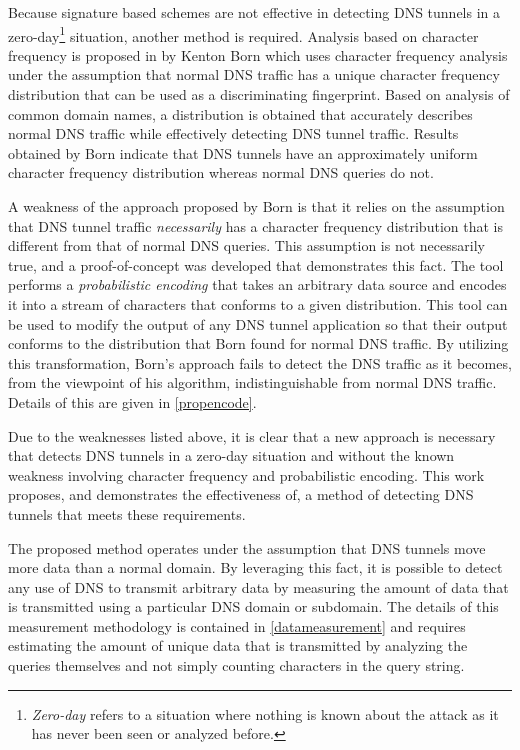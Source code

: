 \documentclass{article}
\theoremstyle{remark}
\theoremstyle{definition}
\theoremstyle{definition}
\theoremstyle{definition}
\begin{document}
Because signature based schemes are not effective in detecting DNS tunnels in a
zero-day\footnote{\emph{Zero-day} refers to a situation where nothing is
known about the attack as it has never been seen or analyzed before.} situation, another
method is required. Analysis based on character frequency is proposed
in\cite{kenton.born.frequency} by Kenton Born which uses character
frequency analysis under the assumption that normal DNS traffic has a unique
character frequency distribution that can be used as a discriminating fingerprint. Based on analysis of common domain names, a
distribution is obtained that accurately describes normal DNS traffic while
effectively detecting DNS tunnel traffic. Results obtained by Born indicate
that DNS tunnels have an approximately uniform character frequency distribution whereas normal DNS queries do not.

A weakness of the approach proposed by Born is that it relies on the assumption
that DNS tunnel traffic \emph{necessarily} has a character frequency
distribution that is different from that of normal DNS queries. This assumption is not necessarily true, and a proof-of-concept
was developed that demonstrates this fact. The tool performs a
\emph{probabilistic encoding} that takes an arbitrary data source and encodes
it into a stream of characters that conforms to a given distribution. This tool
can be used to modify the output of any DNS tunnel application so that their
output conforms to the distribution that Born found for normal DNS traffic. By
utilizing this transformation, Born's approach fails to detect the DNS traffic
as it becomes, from the viewpoint of his algorithm, indistinguishable from
normal DNS traffic. Details of this are given in \ref{propencode}.

Due to the weaknesses listed above, it is clear that a new approach is
necessary that detects DNS tunnels in a zero-day situation and without the known
weakness involving character frequency and probabilistic encoding. This work
proposes, and demonstrates the effectiveness of, a method of detecting DNS
tunnels that meets these requirements.

The proposed method operates under the assumption that DNS tunnels move more
data than a normal domain. By leveraging this fact, it is possible to detect
any use of DNS to transmit arbitrary data by measuring the amount of data that
is transmitted using a particular DNS domain or subdomain. The details of this
measurement methodology is contained in \ref{datameasurement} and requires
estimating the amount of unique data that is transmitted by analyzing the
queries themselves and not simply counting characters in the query string.
\end{document}
